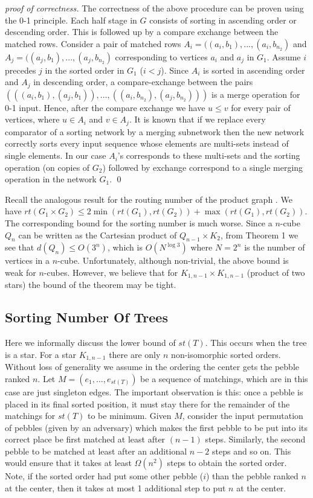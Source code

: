\documentclass[runningheads,a4paper]{llncs}
\begin{document}
\begin{proof}[proof of correctness]	 
	The correctness of the above procedure can be proven using the 0-1 principle. Each half stage in $G$ consists of sorting in ascending order or descending order. This is followed up by a compare exchange between the matched rows. Consider a pair of matched rows $A_i = ((a_i,b_1),...,(a_i,b_{n_2})$ and $A_j = ((a_j,b_1),...,(a_j,b_{n_2})$ corresponding to vertices  $a_i$ and $a_j$ in $G_1$. Assume $i$ precedes $j$ in the sorted order in $G_1$ ($i < j$). Since $A_i$ is sorted in ascending order and $A_j$ in descending order, a compare-exchange between the pairs $(((a_i,b_1),(a_j,b_1)),...,((a_i,b_{n_2}),(a_j,b_{n_2})))$ is a merge operation for 0-1 input. Hence, after the compare exchange we have $u \le v$ for every pair of vertices, where $u \in A_i$ and $v \in A_j$. It is known that \cite{12} if we replace every comparator of a sorting network by a merging subnetwork then the new network correctly sorts every input sequence whose elements are multi-sets  instead of single elements. In our case $A_i$'s corresponds to these multi-sets and the sorting operation (on copies of $G_2$) followed by exchange correspond to a single merging operation in the network $G_1$. \qed 
\end{proof}
Recall the analogous result for the routing number of the product graph \cite{5}. We have $rt(G_1 \times G_2)\le 2 \min(rt(G_1), rt(G_2)) + \max(rt(G_1), rt(G_2))$. The corresponding bound for the sorting number is much worse. Since a $n$-cube $Q_n$ can be written as the Cartesian product of $Q_{n-1} \times K_2$, from Theorem 1 we see that $d(Q_n) \le O(3^n)$, which is $O(N^{\log{3}})$ where $N = 2^n$ is the number of vertices in a $n$-cube. Unfortunately, although non-trivial, the above bound is weak for $n$-cubes. However, we believe that for $K_{1,n-1} \times K_{1,n-1}$ (product of two stars) the bound of the theorem may be tight. 

\subsection{Sorting Number Of Trees}
Here we informally discuss the lower bound of $st(T)$. This occurs when the tree is a star. For a star $K_{1,n-1}$ there are only $n$ non-isomorphic sorted orders. Without loss of generality we assume in the ordering the center gets the pebble ranked $n$. Let $M = (e_1,\ldots,e_{st(T)})$ be a sequence of matchings, which are in this case are just singleton edges. The important observation is this: once a pebble is placed in its final sorted position, it must stay there for the remainder of the matchings for $st(T)$ to be minimum. Given $M$, consider the input permutation of pebbles (given by an adversary) which makes the first pebble  to be put into its correct place be first matched at least after $(n-1)$ steps. Similarly, the second pebble to be matched at least after an additional $n-2$ steps and so on. This would ensure that it takes at least $\Omega(n^2)$ steps to obtain the sorted order. Note, if the sorted order had put some other pebble ($i$) than the pebble ranked $n$ at the center, then it takes at most 1 additional step to put $n$ at the center.
\end{document}
